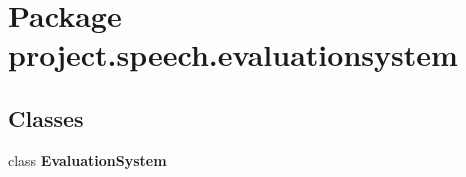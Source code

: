 \section{Package project.\+speech.\+evaluationsystem}
\label{namespaceproject_1_1speech_1_1evaluationsystem}
\subsection*{Classes}
\begin{DoxyCompactItemize}
\item 
class {\bf Evaluation\+System}
\end{DoxyCompactItemize}
